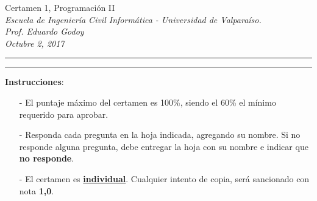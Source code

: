 \documentclass[10pt]{article}
\begin{document}
\begin{center}
    {\Large  Certamen 1, Programaci\'on II} \\
    \emph{\small Escuela de Ingenier\'ia Civil Inform\'atica - Universidad de Valpara\'iso. } \\
    \emph{\small Prof. Eduardo Godoy} \\
    \emph{\scriptsize Octubre 2, 2017}
\end{center}
\vspace*{-35pt}
\begin{center}
    \rule{1\textwidth}{.3pt}
\end{center}
\vspace*{-42pt}
\begin{center}
    \rule{1\textwidth}{2pt}
\end{center}

\vspace*{-15pt}
{\small \textbf{Instrucciones}:}
\vspace*{-15pt}

{\scriptsize
\begin{itemize}
    \item[-] El puntaje m\'aximo del certamen es 100\%, siendo el 60\% el m\'inimo requerido para aprobar.
    \item[-] Responda cada pregunta en la hoja indicada, agregando su nombre. Si no responde alguna pregunta, debe entregar la hoja con su nombre e indicar que \textbf{no responde}.
    \item[-] El certamen es \underline{\textbf{individual}}. Cualquier intento de copia, ser\'a sancionado con nota \textbf{1,0}.
\end{itemize}
}
\vspace*{-20pt}
\end{document}
